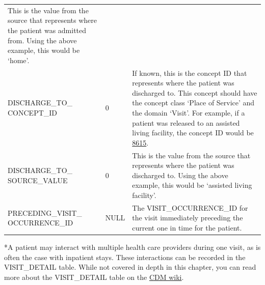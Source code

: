 \documentclass[]{book}
\begin{document}
\begin{longtable}[]{@{}lll@{}}
\begin{minipage}[t]{0.49\columnwidth}
This is the value from the source that represents where the patient was
admitted from. Using the above example, this would be `home'.\strut
\end{minipage}\tabularnewline
\begin{minipage}[t]{0.25\columnwidth}\raggedright\strut
DISCHARGE\_TO\_ CONCEPT\_ID\strut
\end{minipage} & \begin{minipage}[t]{0.17\columnwidth}\raggedright\strut
0\strut
\end{minipage} & \begin{minipage}[t]{0.49\columnwidth}\raggedright\strut
If known, this is the concept ID that represents where the patient was
discharged to. This concept should have the concept class `Place of
Service' and the domain `Visit'. For example, if a patient was released
to an assisted living facility, the concept ID would be
\href{http://athena.ohdsi.org/search-terms/terms/8615}{8615}.\strut
\end{minipage}\tabularnewline
\begin{minipage}[t]{0.25\columnwidth}\raggedright\strut
DISCHARGE\_TO\_ SOURCE\_VALUE\strut
\end{minipage} & \begin{minipage}[t]{0.17\columnwidth}\raggedright\strut
0\strut
\end{minipage} & \begin{minipage}[t]{0.49\columnwidth}\raggedright\strut
This is the value from the source that represents where the patient was
discharged to. Using the above example, this would be `assisted living
facility'.\strut
\end{minipage}\tabularnewline
\begin{minipage}[t]{0.25\columnwidth}\raggedright\strut
PRECEDING\_VISIT\_ OCCURRENCE\_ID\strut
\end{minipage} & \begin{minipage}[t]{0.17\columnwidth}\raggedright\strut
NULL\strut
\end{minipage} & \begin{minipage}[t]{0.49\columnwidth}\raggedright\strut
The VISIT\_OCCURRENCE\_ID for the visit immediately preceding the
current one in time for the patient.\strut
\end{minipage}\tabularnewline
\bottomrule
\end{longtable}

*A patient may interact with multiple health care providers during one
visit, as is often the case with inpatient stays. These interactions can
be recorded in the VISIT\_DETAIL table. While not covered in depth in
this chapter, you can read more about the VISIT\_DETAIL table on the
\href{https://github.com/OHDSI/CommonDataModel/wiki/VISIT_DETAIL}{CDM
wiki}.
\end{document}

